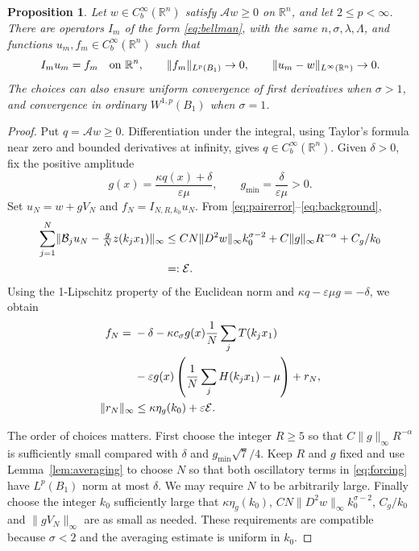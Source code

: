 \documentclass[11pt]{article}
\newcommand{\R}{\mathbb R}
\newcommand{\A}{\mathcal A}
\newcommand{\B}{\mathcal B}
\newcommand{\norm}[1]{\lVert#1\rVert}
\newcommand{\Cb}{C_b^\infty(\R^n)}
\newtheorem{proposition}[theorem]{Proposition}
\theoremstyle{remark}
\numberwithin{equation}{section}
\begin{document}
\begin{proposition}\label{prop:relaxation}
Let $w\in\Cb$ satisfy $\A w\ge0$ on $\R^n$, and let $2\le p<\infty$.
There are operators $I_m$ of the form \eqref{eq:bellman}, with the same
$n,\sigma,\lambda,\Lambda$, and functions $u_m,f_m\in\Cb$ such that
\begin{equation}\label{eq:relaxation}
 I_mu_m=f_m\quad\hbox{on }\R^n,\qquad
 \norm{f_m}_{L^p(B_1)}\to0,\qquad
 \norm{u_m-w}_{L^\infty(\R^n)}\to0.
\end{equation}
The choices can also ensure uniform convergence of first derivatives
when $\sigma>1$, and convergence in ordinary $W^{1,p}(B_1)$ when
$\sigma=1$.
\end{proposition}
\begin{proof}
Put $q=\A w\ge0$. Differentiation under the integral, using Taylor's
formula near zero and bounded derivatives at infinity, gives
$q\in\Cb$. Given $\delta>0$, fix the positive amplitude
\begin{equation}\label{eq:g}
 g(x)=\frac{\kappa q(x)+\delta}{\varepsilon\mu},
 \qquad g_{\min}=\frac{\delta}{\varepsilon\mu}>0.
\end{equation}
Set $u_N=w+gV_N$ and $f_N=I_{N,R,k_0}u_N$. From
\eqref{eq:pairerror}--\eqref{eq:background},
\begin{align}
 \sum_{j=1}^N\norm{\B_ju_N-\tfrac gN z(k_jx_1)}_\infty
 &\le CN\norm{D^2w}_\infty k_0^{\sigma-2}
       +C\norm g_\infty R^{-\alpha}+C_g/k_0\notag\\
 &=:\mathcal E.\label{eq:totalerror}
\end{align}
Using the 1-Lipschitz property of the Euclidean norm and
$\kappa q-\varepsilon\mu g=-\delta$, we obtain
\begin{align}
 f_N={}&-\delta-\kappa c_\sigma g(x)\frac1N\sum_jT(k_jx_1)\notag\\
 &-\varepsilon g(x)\left(\frac1N\sum_jH(k_jx_1)-\mu\right)+r_N,
 \label{eq:forcing}\\
 \norm{r_N}_\infty&\le\kappa\eta_g(k_0)+\varepsilon\mathcal E.\notag
\end{align}

The order of choices matters. First choose the integer $R\ge5$ so that
$C\norm g_\infty R^{-\alpha}$ is sufficiently small compared with
$\delta$ and $g_{\min}\sqrt7/4$. Keep $R$ and $g$ fixed and use
Lemma~\ref{lem:averaging} to choose $N$ so that both oscillatory terms
in \eqref{eq:forcing} have $L^p(B_1)$ norm at most $\delta$.
We may require $N$ to be arbitrarily large. Finally choose the integer
$k_0$ sufficiently large that $\kappa\eta_g(k_0)$,
$CN\norm{D^2w}_\infty k_0^{\sigma-2}$, $C_g/k_0$ and
$\norm{gV_N}_\infty$ are as small as needed. These requirements are
compatible because $\sigma<2$ and the averaging estimate is uniform in
$k_0$.


\end{proof}
\end{document}
